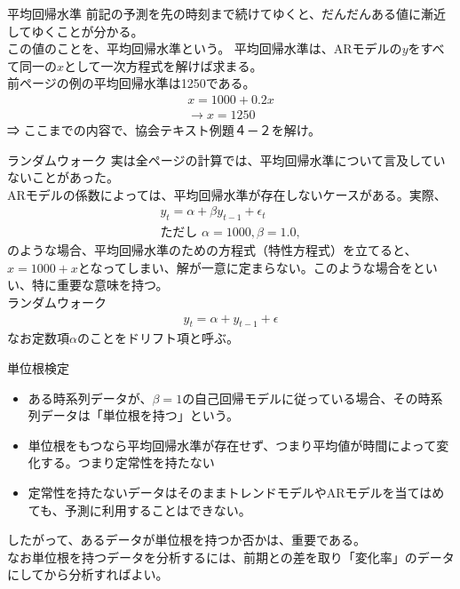 \documentclass[dvipdfmx,autodetect-engine, unicode, 10pt, aspectratio=169]{beamer}
\begin{document}
\begin{frame}{平均回帰水準}
    前記の予測を先の時刻まで続けてゆくと、だんだんある値に漸近してゆくことが分かる。\\
    この値のことを、平均回帰水準という。
    平均回帰水準は、ARモデルの$y$をすべて同一の$x$として一次方程式を解けば求まる。\\
    前ページの例の平均回帰水準は1250である。
    \begin{align*}
        x= 1000 + 0.2x \\
        \rightarrow x=1250
    \end{align*}
    ⇒ ここまでの内容で、協会テキスト例題４－２を解け。
\end{frame}
\begin{frame}{ランダムウォーク}
    実は全ページの計算では、平均回帰水準について言及していないことがあった。\\
    ARモデルの係数によっては、平均回帰水準が存在しないケースがある。実際、
    \begin{align*}
         y_t = \alpha + \beta y_{t-1} + \epsilon_t \\
         \text{ただし  } \alpha = 1000, \beta = 1.0,
    \end{align*}
    のような場合、平均回帰水準のための方程式（特性方程式）を立てると、
    $x = 1000 + x$となってしまい、解が一意に定まらない。このような場合をといい、特に重要な意味を持つ。\\ \vspace{10pt}
    ランダムウォーク
    \begin{align*}
        y_{t}= \alpha + y_{t-1} + \epsilon
    \end{align*}
    なお定数項$\alpha$のことをドリフト項と呼ぶ。
\end{frame}
\begin{frame}{単位根検定}
    \small
    \begin{itemize}
        \item ある時系列データが、$\beta=1$の自己回帰モデルに従っている場合、その時系列データは「単位根を持つ」という。
        \item 単位根をもつなら平均回帰水準が存在せず、つまり平均値が時間によって変化する。つまり定常性を持たない
        \item 定常性を持たないデータはそのままトレンドモデルやARモデルを当てはめても、予測に利用することはできない。
    \end{itemize}
    \normalsize したがって、あるデータが単位根を持つか否かは、重要である。\\
    なお単位根を持つデータを分析するには、前期との差を取り「変化率」のデータにしてから分析すればよい。

\end{frame}
\end{document}
